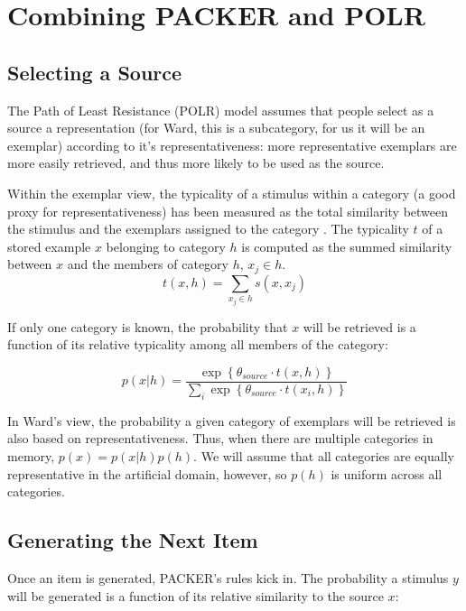 \documentclass[12pt]{article}
\begin{document}
\section{Combining PACKER and POLR}


\subsection{Selecting a Source}

The Path of Least Resistance (POLR) model assumes that people select as a source a representation (for Ward, this is a subcategory, for us it will be an exemplar) according to it's representativeness: more representative exemplars are more easily retrieved, and thus more likely to be used as the source.

Within the exemplar view, the typicality of a stimulus within a category (a good proxy for representativeness) has been measured as the total similarity between the stimulus and the exemplars assigned to the category \citep[see][]{nosofsky1988exemplar}. The typicality $t$ of a stored example $x$ belonging to category $h$ is computed as the summed similarity between $x$ and the members of category $h$, $x_j \in h$.
\begin{equation}
  t(x, h) = \sum_{x_j \in h}{s(x,x_j)}
\end{equation}

If only one category is known, the probability that $x$ will be retrieved is a function of its relative typicality among all members of the category:

\begin{equation}
    p(x | h)  = \dfrac
    { \exp \left\{\theta_{source} \cdot t(x, h) \right\} }
    {\sum_i{\exp \left\{\theta_{source} \cdot t(x_i, h) \right\}}} 
    \label{eq:source_ps}
\end{equation}

In Ward's view, the probability a given category of exemplars will be retrieved is also based on representativeness. Thus, when there are multiple categories in memory, $p(x)  = p(x | h)p(h)$. We will assume that all categories are equally representative in the artificial domain, however, so $p(h)$ is uniform across all categories.

\subsection{Generating the Next Item}

Once an item is generated, PACKER's rules kick in. The probability a stimulus $y$ will be generated is a function of its relative similarity to the source $x$:
\end{document}
